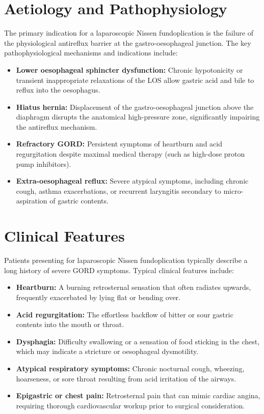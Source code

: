 \section*{Aetiology and Pathophysiology}
The primary indication for a laparoscopic Nissen fundoplication is the failure of the physiological antireflux barrier at the gastro-oesophageal junction. The key pathophysiological mechanisms and indications include:
\begin{itemize}
    \item \textbf{Lower oesophageal sphincter dysfunction:} Chronic hypotonicity or transient inappropriate relaxations of the LOS allow gastric acid and bile to reflux into the oesophagus.
    \item \textbf{Hiatus hernia:} Displacement of the gastro-oesophageal junction above the diaphragm disrupts the anatomical high-pressure zone, significantly impairing the antireflux mechanism.
    \item \textbf{Refractory GORD:} Persistent symptoms of heartburn and acid regurgitation despite maximal medical therapy (such as high-dose proton pump inhibitors).
    \item \textbf{Extra-oesophageal reflux:} Severe atypical symptoms, including chronic cough, asthma exacerbations, or recurrent laryngitis secondary to micro-aspiration of gastric contents.
\end{itemize}

\section*{Clinical Features}
Patients presenting for laparoscopic Nissen fundoplication typically describe a long history of severe GORD symptoms. Typical clinical features include:
\begin{itemize}
    \item \textbf{Heartburn:} A burning retrosternal sensation that often radiates upwards, frequently exacerbated by lying flat or bending over.
    \item \textbf{Acid regurgitation:} The effortless backflow of bitter or sour gastric contents into the mouth or throat.
    \item \textbf{Dysphagia:} Difficulty swallowing or a sensation of food sticking in the chest, which may indicate a stricture or oesophageal dysmotility.
    \item \textbf{Atypical respiratory symptoms:} Chronic nocturnal cough, wheezing, hoarseness, or sore throat resulting from acid irritation of the airways.
    \item \textbf{Epigastric or chest pain:} Retrosternal pain that can mimic cardiac angina, requiring thorough cardiovascular workup prior to surgical consideration.
\end{itemize}

